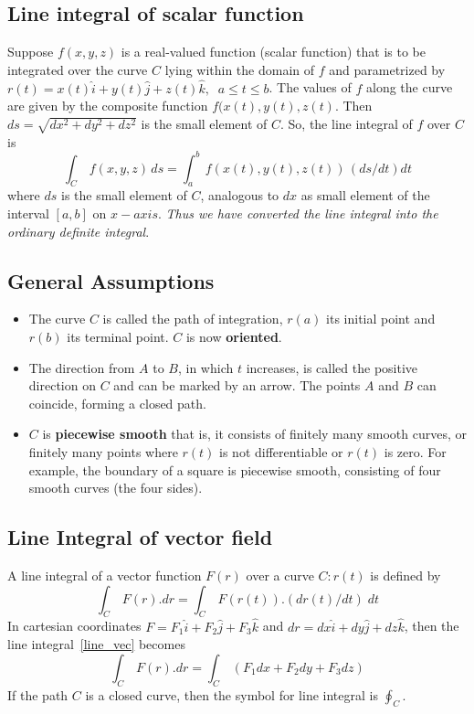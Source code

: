 \documentclass[aima331_lecturenotes_ku.tex]{subfiles}
\begin{document}
\subsection{Line integral of scalar function}
Suppose $f(x,y,z)$ is a real-valued function (scalar function) that is to be integrated over the curve $C$ lying within the domain of $f$ and parametrized by $r(t) = x(t)\hat{i}+y(t)\hat{j} + z(t)\hat{k}, \;\; a \leq t \leq b$. The values of $f$ along the curve are given by the composite function $f(x(t),y(t),z(t)$. Then $ds=\sqrt{dx^2 + dy^2 + dz^2}$ is the small element of $C$. So, the line integral of $f$ over $C$ is
\begin{equation}
  \label{line_scalar}
  \int_C\, f(x,y,z)\,ds =     \int_a^b\, f(x(t),y(t),z(t))\,(ds/dt) dt
\end{equation}
where $ds$ is the small element of $C$, analogous to $dx$ as small element of the interval $[a,b]$ on $x-axis$. \textit{Thus we have converted the line integral into the ordinary definite integral}.

\subsection{General Assumptions}
\begin{itemize}
\item The curve $C$ is called the path of integration, $r(a)$ its initial point and $r(b)$ its terminal point. $C$ is now \textbf{oriented}.

\item The direction from $A$ to $B$, in which $t$ increases, is called the positive direction on $C$ and can be marked by an arrow. The points $A$ and $B$ can coincide, forming a closed path.

\item $C$ is \textbf{piecewise smooth} that is, it consists of finitely many smooth curves, or finitely many points where $r(t)$ is not differentiable or $r(t)$ is zero.  For example, the boundary of a square is piecewise smooth, consisting of four smooth curves (the four sides).
  \end{itemize}

\subsection{Line Integral of vector field}
A line integral of a vector function $F(r)$ over a curve $C:r(t)$ is defined by
\begin{equation}
  \label{line_vec}
  \int_C \, F(r).dr = \int_C \, F(r(t)).(dr(t)/dt)\;dt
\end{equation}
In cartesian coordinates $F=F_1\hat{i} + F_2\hat{j} + F_3\hat{k}$ and $dr=dx\hat{i} + dy\hat{j} + dz\hat{k}$, then the line integral~\ref{line_vec} becomes
\begin{equation}
  \label{line_cartesian}
\int_C \, F(r).dr = \int_C \, (F_1dx+F_2dy+F_3dz)
\end{equation}
If the path $C$ is a closed curve, then the symbol for line integral is $\displaystyle \oint_C$.
\end{document}
